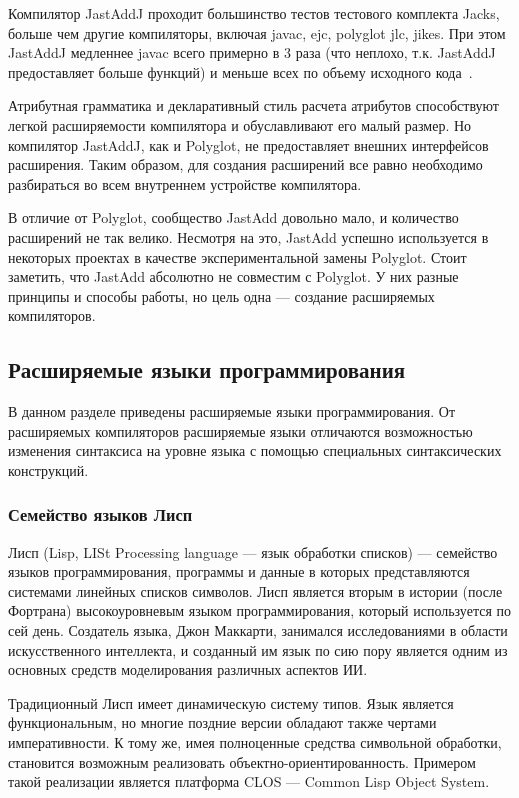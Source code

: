 \documentclass[a4paper,12pt,titlepage]{extarticle}
\begin{document}
Компилятор JastAddJ проходит большинство тестов тестового комплекта Jacks,
больше чем другие компиляторы, включая javac, ejc, polyglot jlc, jikes. При
этом JastAddJ медленнее javac всего примерно в 3 раза (что неплохо, т.к.
JastAddJ предоставляет больше функций) и меньше всех по объему исходного
кода~\cite{JastAddJ}.

Атрибутная грамматика и декларативный стиль расчета атрибутов способствуют
легкой расширяемости компилятора и обуславливают его малый размер. Но
компилятор JastAddJ, как и Polyglot, не предоставляет внешних интерфейсов
расширения. Таким образом, для создания расширений все равно необходимо
разбираться во всем внутреннем устройстве компилятора.

В отличие от Polyglot, сообщество JastAdd довольно мало, и количество
расширений не так велико. Несмотря на это, JastAdd успешно используется в
некоторых проектах в качестве экспериментальной замены Polyglot. Стоит
заметить, что JastAdd абсолютно не совместим с Polyglot. У них разные принципы
и способы работы, но цель одна --- создание расширяемых компиляторов.

\subsection{Расширяемые языки программирования}
\label{extlang}
В данном разделе приведены расширяемые языки программирования. От расширяемых
компиляторов расширяемые языки отличаются возможностью изменения синтаксиса на
уровне языка с помощью специальных синтаксических конструкций.

\subsubsection*{Семейство языков Лисп}
\label{lisp}
Лисп (Lisp, LISt Processing language --- язык обработки списков) --- семейство
языков программирования, программы и данные в которых представляются системами
линейных списков символов. Лисп является вторым в истории (после Фортрана)
высокоуровневым языком программирования, который используется по сей день.
Создатель языка, Джон Маккарти, занимался исследованиями в области
искусственного интеллекта, и созданный им язык по сию пору является одним из
основных средств моделирования различных аспектов ИИ.   

Традиционный Лисп имеет динамическую систему типов. Язык является
функциональным, но многие поздние версии обладают также чертами императивности.
К тому же, имея полноценные средства символьной обработки, становится возможным
реализовать объектно-ориентированность. Примером такой реализации является
платформа CLOS --- Common Lisp Object System.
\end{document}
